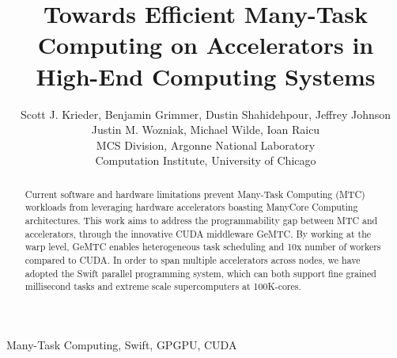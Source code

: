 \documentclass[conference]{IEEEtran}
\begin{document}
%
\title{Towards Efficient Many-Task Computing on Accelerators in High-End Computing Systems}


\author{Scott J. Krieder,
Benjamin Grimmer,
Dustin Shahidehpour,
Jeffrey Johnson\\
Justin M. Wozniak,
Michael Wilde,
Ioan Raicu\\
MCS Division, Argonne National Laboratory\\
Computation Institute, University of Chicago
}


\maketitle


\begin{abstract}
Current software and hardware limitations prevent Many-Task Computing (MTC) workloads from leveraging hardware accelerators boasting ManyCore Computing architectures. This work aims to address the programmability gap between MTC and accelerators, through the innovative CUDA middleware GeMTC. By working at the warp level, GeMTC enables heterogeneous task scheduling and 10x number of workers compared to CUDA. In order to span multiple accelerators across nodes, we have adopted the Swift parallel programming system, which can both support fine grained millisecond tasks and extreme scale supercomputers at 100K-cores.
\end{abstract}

\begin{IEEEkeywords}
Many-Task Computing, Swift, GPGPU, CUDA
\end{IEEEkeywords}

\IEEEpeerreviewmaketitle
\end{document}

